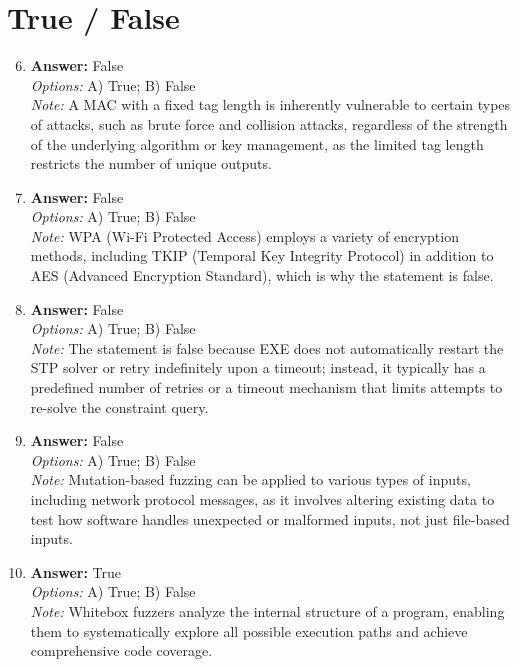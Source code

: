 \documentclass[12pt]{article}
\begin{document}
\section*{True / False}
\begin{enumerate}[label=\arabic*.]
\setcounter{enumi}{5}
\item \textbf{Answer:} False
\\ \textit{Options:} A) True; B) False
\\ \textit{Note:} A MAC with a fixed tag length is inherently vulnerable to certain types of attacks, such as brute force and collision attacks, regardless of the strength of the underlying algorithm or key management, as the limited tag length restricts the number of unique outputs.
\item \textbf{Answer:} False
\\ \textit{Options:} A) True; B) False
\\ \textit{Note:} WPA (Wi-Fi Protected Access) employs a variety of encryption methods, including TKIP (Temporal Key Integrity Protocol) in addition to AES (Advanced Encryption Standard), which is why the statement is false.
\item \textbf{Answer:} False
\\ \textit{Options:} A) True; B) False
\\ \textit{Note:} The statement is false because EXE does not automatically restart the STP solver or retry indefinitely upon a timeout; instead, it typically has a predefined number of retries or a timeout mechanism that limits attempts to re-solve the constraint query.
\item \textbf{Answer:} False
\\ \textit{Options:} A) True; B) False
\\ \textit{Note:} Mutation-based fuzzing can be applied to various types of inputs, including network protocol messages, as it involves altering existing data to test how software handles unexpected or malformed inputs, not just file-based inputs.
\item \textbf{Answer:} True
\\ \textit{Options:} A) True; B) False
\\ \textit{Note:} Whitebox fuzzers analyze the internal structure of a program, enabling them to systematically explore all possible execution paths and achieve comprehensive code coverage.
\end{enumerate}
\end{document}
